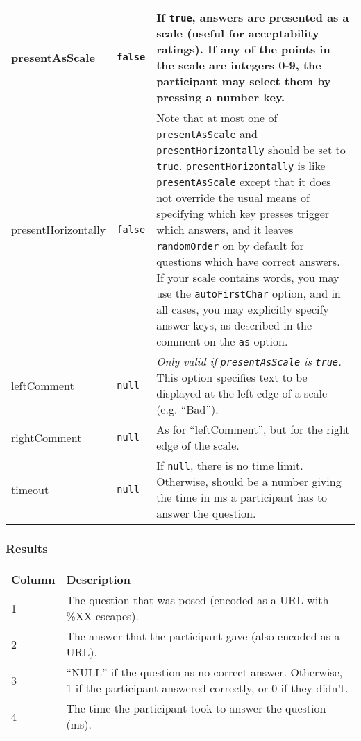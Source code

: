 \documentclass[11pt,letterpaper]{article}
\begin{document}
\begin{RaggedRight}
\begin{tabular}{|p{1.0168in}|p{1.0154in}|p{3.4677in}|}
\hline
 presentAsScale  &  \texttt{false}       &  If \texttt{true}, answers are presented as a scale (useful for acceptability ratings). If any of the points in the scale are integers 0-9, the participant may select them by pressing a number key. \\
\hline
 presentHorizontally  &  \texttt{false}   &  Note that at most one of \texttt{presentAsScale} and \texttt{presentHorizontally} should be set to \texttt{true}. \texttt{presentHorizontally} is like \texttt{presentAsScale} except that it does not override the usual means of specifying which key presses trigger which answers, and it leaves \texttt{randomOrder} on by default for questions which have correct answers. If your scale contains words, you may use the \texttt{autoFirstChar} option, and in all cases, you may explicitly specify answer keys, as described in the comment on the \texttt{as} option. \\
\hline
 leftComment     &  \texttt{null}        & \textit{ Only valid if }\textit{\texttt{presentAsScale}}\textit{ is }\textit{\texttt{true}}\textit{.}  This option specifies text to be displayed at the left edge of a scale (e.g. ``Bad''). \\
\hline
 rightComment    &  \texttt{null}        &  As for ``leftComment'', but for the right edge of the scale. \\
\hline
 timeout         &  \texttt{null}        &  If \texttt{null}, there is no time limit. Otherwise, should be a number giving the time in ms a participant has to answer the question. 
\\\hline
\end{tabular}
\end{RaggedRight}
\fussy

\normalsize

\subsubsection*{Results}



\footnotesize
\begin{RaggedRight}
\sloppy
\begin{tabular}{|p{1.0752in}|p{4.4248in}|}
\hline
 \textbf{Column}  &  \textbf{Description} \\
\hline
 1         &  The question that was posed (encoded as a URL with \%XX escapes). \\
\hline
 2         &  The answer that the participant gave (also encoded as a URL).    \\
\hline
 3         &  ``NULL'' if the question as no correct answer. Otherwise, 1 if the participant answered correctly, or 0 if they didn't. \\
\hline
 4         &  The time the participant took to answer the question (ms). 
\\\hline
\end{tabular}
\end{RaggedRight}
\fussy
\end{document}
